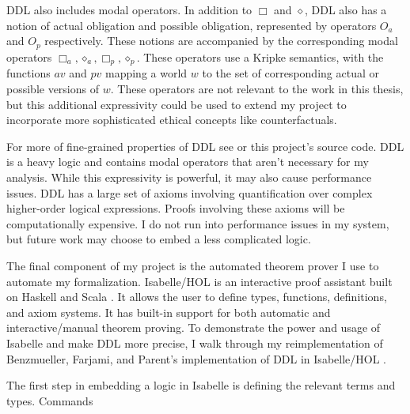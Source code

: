 \begin{isabellebody}
\begin{isamarkuptext}
DDL also includes modal operators. In addition to $\Box$ and $\diamond$, DDL also has a notion
of actual obligation and possible obligation, represented by operators $O_a$ and $O_p$ respectively. 
These notions are accompanied by the corresponding modal operators $\Box_a, \diamond_a, \Box_p, \diamond_p$. 
These operators use a Kripke semantics, with the functions $av$ and $pv$ mapping a world $w$ to the set 
of corresponding actual or possible versions of $w$. These operators are not relevant to the work in 
this thesis, but this additional expressivity could be used to extend my project to incorporate 
more sophisticated ethical concepts like counterfactuals.

For more of fine-grained properties of DDL see \citet{CJDDL} or this project's source code. DDL is a heavy logic and contains modal operators 
that aren't necessary for my analysis. While this expressivity is powerful, it may also cause performance
issues. DDL has a large set of axioms involving quantification over complex higher-order
logical expressions. Proofs involving these axioms will be computationally expensive. I do not run 
into performance issues in my system, but future work may choose to embed a less complicated logic.%
\end{isamarkuptext}\isamarkuptrue%
%
\isadelimdocument
%
\endisadelimdocument
%
\isatagdocument
%
\isamarkuptrue%
%
\endisatagdocument
{\isafolddocument}%
%
\isadelimdocument
%
\endisadelimdocument
%
\begin{isamarkuptext}%
The final component of my project is the automated theorem prover I use to automate my formalization.
Isabelle/HOL is an interactive proof assistant built on Haskell and Scala \citep{isabelle}. It 
allows the user to define types, functions, definitions, and axiom systems. It has built-in support for both
automatic and interactive/manual theorem proving. To demonstrate the power and usage of Isabelle and 
make DDL more precise, I walk through my reimplementation
of Benzmueller, Farjami, and Parent's implementation of DDL in Isabelle/HOL \cite{BFP, logikey}.%
\end{isamarkuptext}\isamarkuptrue%
%
\isadelimdocument
%
\endisadelimdocument
%
\isatagdocument
%
\isamarkuptrue%
%
\endisatagdocument
{\isafolddocument}%
%
\isadelimdocument
%
\endisadelimdocument
%
\begin{isamarkuptext}%
The first step in embedding a logic in Isabelle is defining the relevant terms and types. Commands

\end{isamarkuptext}
\end{isabellebody}
